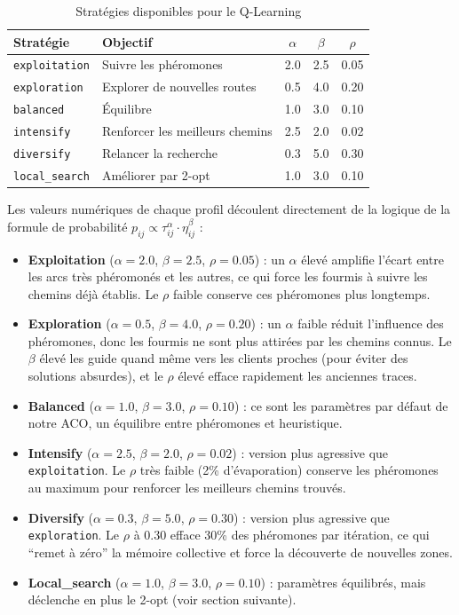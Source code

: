 \documentclass[12pt, a4paper]{article}
\begin{document}
\begin{table}[H]
\centering
\caption{Stratégies disponibles pour le Q-Learning}
\label{tab:strategies}
\begin{tabular}{llccc}
\toprule
\textbf{Stratégie} & \textbf{Objectif} & $\alpha$ & $\beta$ & $\rho$ \\
\midrule
\texttt{exploitation} & Suivre les phéromones & 2.0 & 2.5 & 0.05 \\
\texttt{exploration} & Explorer de nouvelles routes & 0.5 & 4.0 & 0.20 \\
\texttt{balanced} & Équilibre & 1.0 & 3.0 & 0.10 \\
\texttt{intensify} & Renforcer les meilleurs chemins & 2.5 & 2.0 & 0.02 \\
\texttt{diversify} & Relancer la recherche & 0.3 & 5.0 & 0.30 \\
\texttt{local\_search} & Améliorer par 2-opt & 1.0 & 3.0 & 0.10 \\
\bottomrule
\end{tabular}
\end{table}

Les valeurs numériques de chaque profil découlent directement de la logique de la formule de probabilité $p_{ij} \propto \tau_{ij}^\alpha \cdot \eta_{ij}^\beta$ :

\begin{itemize}
    \item \textbf{Exploitation} ($\alpha=2.0$, $\beta=2.5$, $\rho=0.05$) : un $\alpha$ élevé amplifie l'écart entre les arcs très phéromonés et les autres, ce qui force les fourmis à suivre les chemins déjà établis. Le $\rho$ faible conserve ces phéromones plus longtemps.
    \item \textbf{Exploration} ($\alpha=0.5$, $\beta=4.0$, $\rho=0.20$) : un $\alpha$ faible réduit l'influence des phéromones, donc les fourmis ne sont plus attirées par les chemins connus. Le $\beta$ élevé les guide quand même vers les clients proches (pour éviter des solutions absurdes), et le $\rho$ élevé efface rapidement les anciennes traces.
    \item \textbf{Balanced} ($\alpha=1.0$, $\beta=3.0$, $\rho=0.10$) : ce sont les paramètres par défaut de notre ACO, un équilibre entre phéromones et heuristique.
    \item \textbf{Intensify} ($\alpha=2.5$, $\beta=2.0$, $\rho=0.02$) : version plus agressive que \texttt{exploitation}. Le $\rho$ très faible (2\% d'évaporation) conserve les phéromones au maximum pour renforcer les meilleurs chemins trouvés.
    \item \textbf{Diversify} ($\alpha=0.3$, $\beta=5.0$, $\rho=0.30$) : version plus agressive que \texttt{exploration}. Le $\rho$ à 0.30 efface 30\% des phéromones par itération, ce qui ``remet à zéro'' la mémoire collective et force la découverte de nouvelles zones.
    \item \textbf{Local\_search} ($\alpha=1.0$, $\beta=3.0$, $\rho=0.10$) : paramètres équilibrés, mais déclenche en plus le 2-opt (voir section suivante).
\end{itemize}
\end{document}
